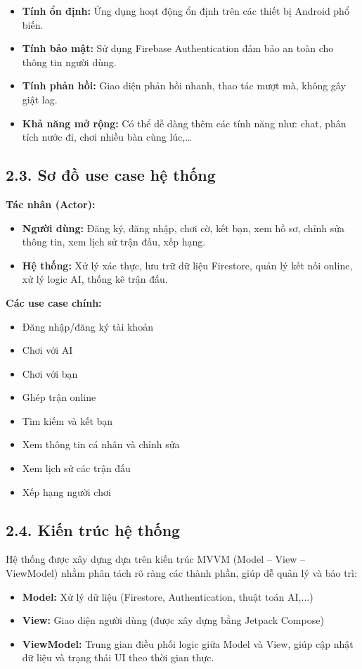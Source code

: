 \documentclass[a4paper,12pt]{article}
\begin{document}
\justify
\begin{itemize}[label=·]
    \item \textbf{Tính ổn định:} Ứng dụng hoạt động ổn định trên các thiết bị Android phổ biến.
    \item \textbf{Tính bảo mật:} Sử dụng Firebase Authentication đảm bảo an toàn cho thông tin người dùng.
    \item \textbf{Tính phản hồi:} Giao diện phản hồi nhanh, thao tác mượt mà, không gây giật lag.
    \item \textbf{Khả năng mở rộng:} Có thể dễ dàng thêm các tính năng như: chat, phân tích nước đi, chơi nhiều bàn cùng lúc,…
\end{itemize}

\subsection*{2.3. Sơ đồ use case hệ thống} %

\justify
\noindent \textbf{Tác nhân (Actor):}
\begin{itemize}[label=·]
    \item \textbf{Người dùng:} Đăng ký, đăng nhập, chơi cờ, kết bạn, xem hồ sơ, chỉnh sửa thông tin, xem lịch sử trận đấu, xếp hạng.
    \item \textbf{Hệ thống:} Xử lý xác thực, lưu trữ dữ liệu Firestore, quản lý kết nối online, xử lý logic AI, thống kê trận đấu.
\end{itemize}

\noindent \textbf{Các use case chính:}
\begin{itemize}[label=·]
    \item Đăng nhập/đăng ký tài khoản
    \item Chơi với AI
    \item Chơi với bạn
    \item Ghép trận online
    \item Tìm kiếm và kết bạn
    \item Xem thông tin cá nhân và chỉnh sửa
    \item Xem lịch sử các trận đấu
    \item Xếp hạng người chơi
\end{itemize}

\subsection*{2.4. Kiến trúc hệ thống} %

\justify
\noindent Hệ thống được xây dựng dựa trên kiến trúc MVVM (Model – View – ViewModel) nhằm phân tách rõ ràng các thành phần, giúp dễ quản lý và bảo trì:
\begin{itemize}[label=·]
    \item \textbf{Model:} Xử lý dữ liệu (Firestore, Authentication, thuật toán AI,...)
    \item \textbf{View:} Giao diện người dùng (được xây dựng bằng Jetpack Compose)
    \item \textbf{ViewModel:} Trung gian điều phối logic giữa Model và View, giúp cập nhật dữ liệu và trạng thái UI theo thời gian thực.
\end{itemize}
\end{document}
